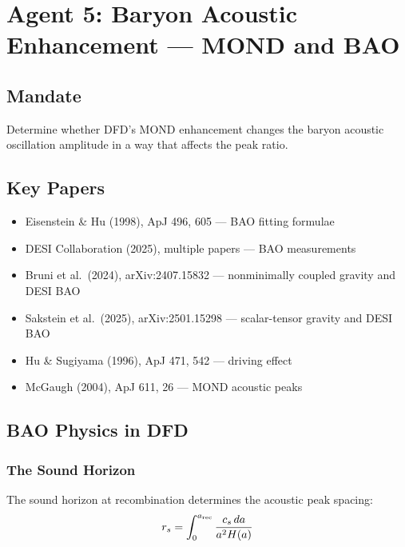 \documentclass[11pt,a4paper]{article}
\begin{document}
\newpage
\section{Agent 5: Baryon Acoustic Enhancement --- MOND and BAO}
\label{sec:agent5}

\subsection{Mandate}

Determine whether DFD's MOND enhancement changes the baryon acoustic oscillation amplitude in a way that affects the peak ratio.

\subsection{Key Papers}

\begin{itemize}
\item Eisenstein \& Hu (1998), ApJ 496, 605 --- BAO fitting formulae
\item DESI Collaboration (2025), multiple papers --- BAO measurements
\item Bruni et al.\ (2024), arXiv:2407.15832 --- nonminimally coupled gravity and DESI BAO
\item Sakstein et al.\ (2025), arXiv:2501.15298 --- scalar-tensor gravity and DESI BAO
\item Hu \& Sugiyama (1996), ApJ 471, 542 --- driving effect
\item McGaugh (2004), ApJ 611, 26 --- MOND acoustic peaks
\end{itemize}

\subsection{BAO Physics in DFD}

\subsubsection{The Sound Horizon}

The sound horizon at recombination determines the acoustic peak spacing:
\begin{equation}
r_s = \int_0^{a_{\rm rec}} \frac{c_s\,da}{a^2 H(a)}
\end{equation}
\end{document}
